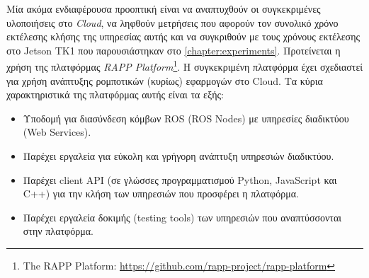 Μία ακόμα ενδιαφέρουσα προοπτική είναι να αναπτυχθούν οι συγκεκριμένες υλοποιήσεις στο \emph{Cloud},
να ληφθούν μετρήσεις που αφορούν τον συνολικό χρόνο εκτέλεσης κλήσης
της υπηρεσίας αυτής και να συγκριθούν με τους χρόνους εκτέλεσης στο Jetson TK1
που παρουσιάστηκαν στο \autoref{chapter:experiments}.
Προτείνεται η χρήση της πλατφόρμας \emph{RAPP Platform}\footnote{The RAPP Platform: \url{https://github.com/rapp-project/rapp-platform}}.
Η συγκεκριμένη πλατφόρμα έχει σχεδιαστεί για χρήση ανάπτυξης ρομποτικών (κυρίως)
εφαρμογών στο Cloud. Τα κύρια χαρακτηριστικά της πλατφόρμας αυτής είναι τα εξής:
\begin{itemize}
  \item{Υποδομή για διασύνδεση κόμβων ROS (ROS Nodes) με υπηρεσίες διαδικτύου (Web Services).}
  \item{Παρέχει εργαλεία για εύκολη και γρήγορη ανάπτυξη υπηρεσιών διαδικτύου.}
  \item{Παρέχει client API (σε γλώσσες προγραμματισμού Python, JavaScript και C++) για την κλήση των υπηρεσιών που προσφέρει η πλατφόρμα.}
  \item{Παρέχει εργαλεία δοκιμής (testing tools) των υπηρεσιών που αναπτύσσονται στην πλατφόρμα.}
\end{itemize}

